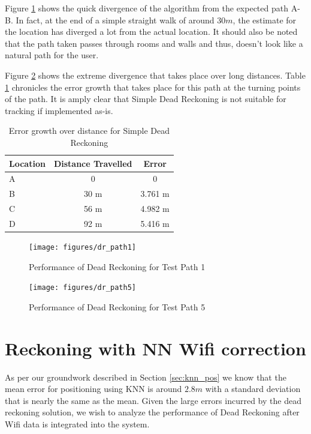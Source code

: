 Figure \ref{fig:dr_path1} shows the quick divergence of the algorithm
from the expected path A-B. In fact, at the end of a simple straight walk of 
around $30 m$, the estimate for the location has diverged a lot from the 
actual location. It should also be noted that the path taken passes through
rooms and walls and thus, doesn't look like a natural path for the user.

Figure \ref{fig:dr_path5} shows the extreme divergence that takes place 
over long distances. Table \ref{tbl:dr_error_growth} chronicles the 
error growth that takes place for this path at the turning points of the path.
It is amply clear that Simple Dead Reckoning is not suitable for tracking
if implemented as-is.

\begin{table}[bph]
\centering
\begin{tabular}{l c c}
\hline
\hline
Location    & Distance Travelled    & Error \\
\hline
A           & 0                     & 0 \\
B           & 30 m                  & 3.761 m \\
C           & 56 m                  & 4.982 m \\
D           & 92 m                  & 5.416 m \\
\hline
\end{tabular}
\caption{Error growth over distance for Simple Dead Reckoning\label{tbl:dr_error_growth}}
\end{table}

\begin{figure}
    \centering
    \texttt{[image: figures/dr\_path1]}
    \caption{Performance of Dead Reckoning for Test Path 1\label{fig:dr_path1}}
\end{figure}
 
\begin{figure}
    \centering
    \texttt{[image: figures/dr\_path5]}
    \caption{Performance of Dead Reckoning for Test Path 5\label{fig:dr_path5}}
\end{figure}
 
 

\section{Reckoning with NN Wifi correction}

As per our groundwork described in Section \ref{sec:knn_pos} we know that the 
mean error for positioning using KNN is around $2.8 m$ with a standard deviation
that is nearly the same as the mean. Given the large errors incurred by 
the dead reckoning solution, we wish to analyze the performance of Dead 
Reckoning after Wifi data is integrated into the system.

